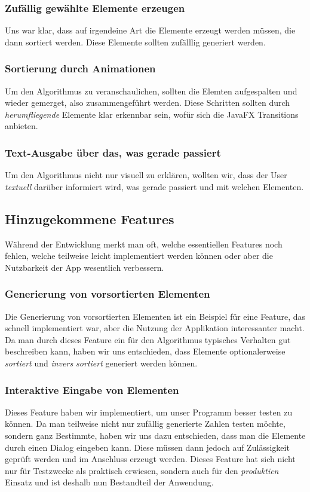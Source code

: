 \subsubsection{Zufällig gewählte Elemente erzeugen}
Uns war klar, dass auf irgendeine Art die Elemente erzeugt werden müssen, die dann sortiert werden. Diese Elemente sollten zufälllig generiert werden.

\subsubsection{Sortierung durch Animationen}
Um den Algorithmus zu veranschaulichen, sollten die Elemten aufgespalten und wieder gemerget, also zusammengeführt werden. Diese Schritten sollten durch \textit{herumfliegende} Elemente klar erkennbar sein, wofür sich die JavaFX Transitions anbieten.

\subsubsection{Text-Ausgabe über das, was gerade passiert}
Um den Algorithmus nicht nur visuell zu erklären, wollten wir, dass der User \textit{textuell} darüber informiert wird, was gerade passiert und mit welchen Elementen.

\subsection{Hinzugekommene Features}
Während der Entwicklung merkt man oft, welche essentiellen Features noch fehlen, welche teilweise leicht implementiert werden können oder aber die Nutzbarkeit der App wesentlich verbessern.
\subsubsection{Generierung von vorsortierten Elementen}
Die Generierung von vorsortierten Elementen ist ein Beispiel für eine Feature, das schnell implementiert war, aber die Nutzung der Applikation interessanter macht. Da man durch dieses Feature ein für den Algorithmus typisches Verhalten gut beschreiben kann, haben wir uns entschieden, dass Elemente optionalerweise \textit{sortiert} und \textit{invers sortiert} generiert werden können.

\subsubsection{Interaktive Eingabe von Elementen}
Dieses Feature haben wir implementiert, um unser Programm besser testen zu können. Da man teilweise nicht nur zufällig generierte Zahlen testen möchte, sondern ganz Bestimmte, haben wir uns dazu entschieden, dass man die Elemente durch einen Dialog eingeben kann. Diese müssen dann jedoch auf Zulässigkeit geprüft werden und im Anschluss erzeugt werden. Dieses Feature hat sich nicht nur für Testzwecke als praktisch erwiesen, sondern auch für den \textit{produktien} Einsatz und ist deshalb nun Bestandteil der Anwendung.

